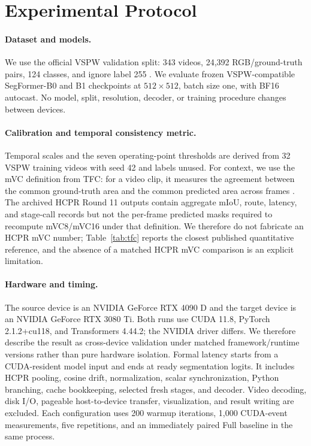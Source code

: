 \documentclass[runningheads]{llncs}
\begin{document}
\section{Experimental Protocol}
\paragraph{Dataset and models.} We use the official VSPW validation split: 343 videos, 24,392 RGB/ground-truth pairs, 124 classes, and ignore label 255 \cite{miao2021vspw}. We evaluate frozen VSPW-compatible SegFormer-B0 and B1 checkpoints at $512\times512$, batch size one, with BF16 autocast. No model, split, resolution, decoder, or training procedure changes between devices.

\paragraph{Calibration and temporal consistency metric.} Temporal scales and the seven operating-point thresholds are derived from 32 VSPW training videos with seed 42 and labels unused. For context, we use the mVC definition from TFC: for a video clip, it measures the agreement between the common ground-truth area and the common predicted area across frames \cite{lin2024tfc}. The archived HCPR Round 11 outputs contain aggregate mIoU, route, latency, and stage-call records but not the per-frame predicted masks required to recompute mVC8/mVC16 under that definition. We therefore do not fabricate an HCPR mVC number; Table~\ref{tab:tfc} reports the closest published quantitative reference, and the absence of a matched HCPR mVC comparison is an explicit limitation.

\paragraph{Hardware and timing.} The source device is an NVIDIA GeForce RTX 4090 D and the target device is an NVIDIA GeForce RTX 3080 Ti. Both runs use CUDA 11.8, PyTorch 2.1.2+cu118, and Transformers 4.44.2; the NVIDIA driver differs. We therefore describe the result as cross-device validation under matched framework/runtime versions rather than pure hardware isolation. Formal latency starts from a CUDA-resident model input and ends at ready segmentation logits. It includes HCPR pooling, cosine drift, normalization, scalar synchronization, Python branching, cache bookkeeping, selected fresh stages, and decoder. Video decoding, disk I/O, pageable host-to-device transfer, visualization, and result writing are excluded. Each configuration uses 200 warmup iterations, 1,000 CUDA-event measurements, five repetitions, and an immediately paired Full baseline in the same process.
\end{document}
